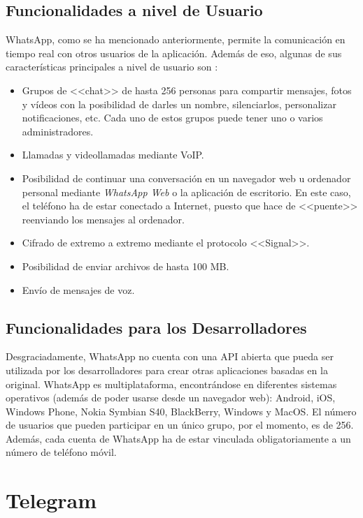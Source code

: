 \subsection{Funcionalidades a nivel de Usuario}
WhatsApp, como se ha mencionado anteriormente, permite la comunicación en tiempo real con otros usuarios de la aplicación. Además de eso, algunas de sus características principales a nivel de usuario son \cite{WhatsApp2017}:

\begin{itemize}
	\item Grupos de <<chat>> de hasta 256 personas para compartir mensajes, fotos y vídeos con la posibilidad de darles un nombre, silenciarlos, personalizar notificaciones, etc. Cada uno de estos grupos puede tener uno o varios administradores.
	\item Llamadas y videollamadas mediante \acf{VoIP}.
	\item Posibilidad de continuar una conversación en un navegador web u ordenador personal mediante \textit{WhatsApp Web} o la aplicación de escritorio. En este caso, el teléfono ha de estar conectado a Internet, puesto que hace de <<puente>> reenviando los mensajes al ordenador.
	\item Cifrado de extremo a extremo mediante el protocolo <<Signal>>.
	\item Posibilidad de enviar archivos de hasta 100 \acs{MB}.
	\item Envío de mensajes de voz.
\end{itemize}


\subsection{Funcionalidades para los Desarrolladores}
Desgraciadamente, WhatsApp no cuenta con una \acs{API} abierta que pueda ser utilizada por los desarrolladores para crear otras aplicaciones basadas en la original. WhatsApp es multiplataforma, encontrándose en diferentes sistemas operativos (además de poder usarse desde un navegador web): Android, iOS, Windows Phone, Nokia Symbian S40, BlackBerry, Windows y MacOS. El número de usuarios que pueden participar en un único grupo, por el momento, es de 256. Además, cada cuenta de WhatsApp ha de estar vinculada obligatoriamente a un número de teléfono móvil.

\newpage

\section{Telegram}
\label{sec:telegram}

